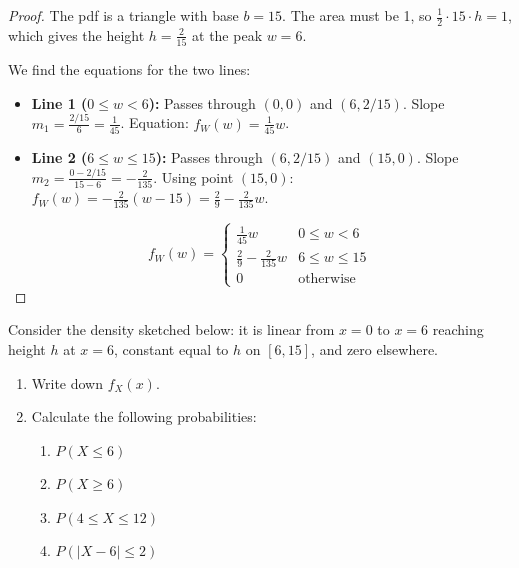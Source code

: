 \begin{proof}
The pdf is a triangle with base $b=15$. The area must be 1, so $\frac{1}{2} \cdot 15 \cdot h = 1$, which gives the height $h = \frac{2}{15}$ at the peak $w=6$.

We find the equations for the two lines:
\begin{itemize}
    \item \textbf{Line 1 ($0 \leq w < 6$):} Passes through $(0,0)$ and $(6, 2/15)$.
    Slope $m_1 = \frac{2/15}{6} = \frac{1}{45}$.
    Equation: $f_W(w) = \frac{1}{45}w$.
    
    \item \textbf{Line 2 ($6 \leq w \leq 15$):} Passes through $(6, 2/15)$ and $(15, 0)$.
    Slope $m_2 = \frac{0 - 2/15}{15 - 6} = -\frac{2}{135}$.
    Using point $(15,0)$: $f_W(w) = -\frac{2}{135}(w - 15) = \frac{2}{9} - \frac{2}{135}w$.
\end{itemize}

\[
f_W(w) = \begin{cases}
\frac{1}{45}w & 0 \leq w < 6 \\
\frac{2}{9} - \frac{2}{135}w & 6 \leq w \leq 15 \\
0 & \text{otherwise}
\end{cases}
\]
\end{proof}



\begin{exercise}
Consider the density sketched below: it is linear from \(x=0\) to \(x=6\) reaching height \(h\) at \(x=6\), constant equal to \(h\) on \([6,15]\), and zero elsewhere.

\begin{center}
\end{center}

\begin{enumerate}[label=(\alph*)]
  \item Write down \(f_X(x)\).
  \item Calculate the following probabilities:
  \begin{enumerate}[label=(\roman*)]
    \item \(P(X\le 6)\)
    \item \(P(X\ge 6)\)
    \item \(P(4\le X\le 12)\)
    \item \(P(|X-6|\le 2)\)
  \end{enumerate}
\end{enumerate}
\end{exercise}

